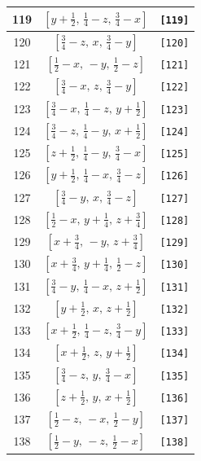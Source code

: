 \documentclass[fleqn,8pt]{jsarticle}
\begin{document}
\begin{longtable}{ccc}
119 & $\left[ y + \frac{1}{2},\, \frac{1}{4} - z,\, \frac{3}{4} - x \right]$ & {\tt [119]} \\ \hline
120 & $\left[ \frac{3}{4} - z,\, x,\, \frac{3}{4} - y \right]$ & {\tt [120]} \\ \hline
121 & $\left[ \frac{1}{2} - x,\, - y,\, \frac{1}{2} - z \right]$ & {\tt [121]} \\ \hline
122 & $\left[ \frac{3}{4} - x,\, z,\, \frac{3}{4} - y \right]$ & {\tt [122]} \\ \hline
123 & $\left[ \frac{3}{4} - x,\, \frac{1}{4} - z,\, y + \frac{1}{2} \right]$ & {\tt [123]} \\ \hline
124 & $\left[ \frac{3}{4} - z,\, \frac{1}{4} - y,\, x + \frac{1}{2} \right]$ & {\tt [124]} \\ \hline
125 & $\left[ z + \frac{1}{2},\, \frac{1}{4} - y,\, \frac{3}{4} - x \right]$ & {\tt [125]} \\ \hline
126 & $\left[ y + \frac{1}{2},\, \frac{1}{4} - x,\, \frac{3}{4} - z \right]$ & {\tt [126]} \\ \hline
127 & $\left[ \frac{3}{4} - y,\, x,\, \frac{3}{4} - z \right]$ & {\tt [127]} \\ \hline
128 & $\left[ \frac{1}{2} - x,\, y + \frac{1}{4},\, z + \frac{3}{4} \right]$ & {\tt [128]} \\ \hline
129 & $\left[ x + \frac{3}{4},\, - y,\, z + \frac{3}{4} \right]$ & {\tt [129]} \\ \hline
130 & $\left[ x + \frac{3}{4},\, y + \frac{1}{4},\, \frac{1}{2} - z \right]$ & {\tt [130]} \\ \hline
131 & $\left[ \frac{3}{4} - y,\, \frac{1}{4} - x,\, z + \frac{1}{2} \right]$ & {\tt [131]} \\ \hline
132 & $\left[ y + \frac{1}{2},\, x,\, z + \frac{1}{2} \right]$ & {\tt [132]} \\ \hline
133 & $\left[ x + \frac{1}{2},\, \frac{1}{4} - z,\, \frac{3}{4} - y \right]$ & {\tt [133]} \\ \hline
134 & $\left[ x + \frac{1}{2},\, z,\, y + \frac{1}{2} \right]$ & {\tt [134]} \\ \hline
135 & $\left[ \frac{3}{4} - z,\, y,\, \frac{3}{4} - x \right]$ & {\tt [135]} \\ \hline
136 & $\left[ z + \frac{1}{2},\, y,\, x + \frac{1}{2} \right]$ & {\tt [136]} \\ \hline
137 & $\left[ \frac{1}{2} - z,\, - x,\, \frac{1}{2} - y \right]$ & {\tt [137]} \\ \hline
138 & $\left[ \frac{1}{2} - y,\, - z,\, \frac{1}{2} - x \right]$ & {\tt [138]} \\ \hline

\end{longtable}
\end{document}
